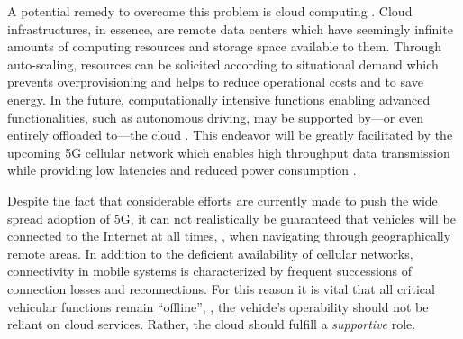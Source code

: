 A potential remedy to overcome this problem is cloud computing \cite{mell2011nist} . Cloud infrastructures, in essence, are remote data centers which have seemingly infinite amounts of computing resources and storage space available to them. Through auto-scaling, resources can be solicited according to situational demand which prevents overprovisioning and helps to reduce operational costs and to save energy. In the future, computationally intensive functions enabling advanced functionalities, such as autonomous driving, may be supported by---or even entirely offloaded to---the cloud \cite{liu2017unified}. This endeavor will be greatly facilitated by the upcoming 5G cellular network which enables high throughput data transmission while providing low latencies and reduced power consumption \cite{andrews2014will}.

Despite the fact that considerable efforts are currently made to push the wide spread adoption of 5G, it can not realistically be guaranteed that vehicles will be connected to the Internet at all times, \eg , when navigating through geographically remote areas. In addition to the deficient availability of cellular networks, connectivity in mobile systems is characterized by frequent successions of connection losses and reconnections. For this reason it is vital that all critical vehicular functions remain ``offline'', \ie , the vehicle's operability should not be reliant on cloud services. Rather, the cloud should fulfill a \emph{supportive} role.

%
%
%
%
%
%
%
%
%
%

